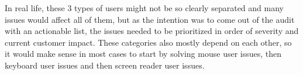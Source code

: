 \documentclass{master_thesis}
\begin{document}
In real life, these 3 types of users might not be so clearly separated and many issues would affect all of them, but as the intention was to come out of the audit with an actionable list, the issues needed to be prioritized in order of severity and current customer impact. These categories also mostly depend on each other, so it would make sense in most cases to start by solving mouse user issues, then keyboard user issues and then screen reader user issues.
\end{document}
